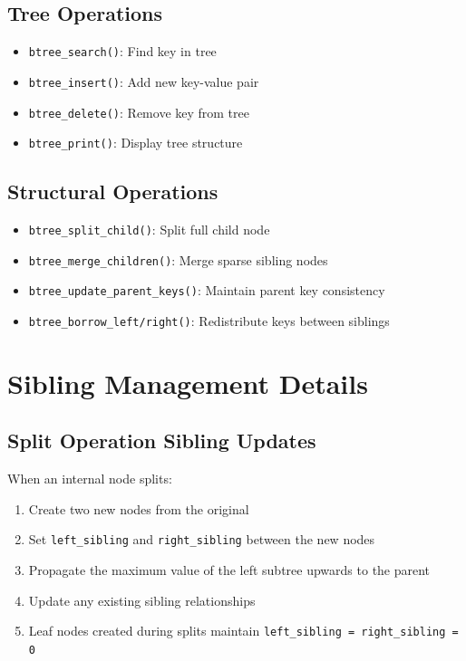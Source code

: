\documentclass[12pt,a4paper]{article}
\begin{document}
\subsection{Tree Operations}
\begin{itemize}
    \item \texttt{btree\_search()}: Find key in tree
    \item \texttt{btree\_insert()}: Add new key-value pair
    \item \texttt{btree\_delete()}: Remove key from tree
    \item \texttt{btree\_print()}: Display tree structure
\end{itemize}

\subsection{Structural Operations}
\begin{itemize}
    \item \texttt{btree\_split\_child()}: Split full child node
    \item \texttt{btree\_merge\_children()}: Merge sparse sibling nodes
    \item \texttt{btree\_update\_parent\_keys()}: Maintain parent key consistency
    \item \texttt{btree\_borrow\_left/right()}: Redistribute keys between siblings
\end{itemize}

\section{Sibling Management Details}

\subsection{Split Operation Sibling Updates}

When an internal node splits:
\begin{enumerate}
    \item Create two new nodes from the original
    \item Set \texttt{left\_sibling} and \texttt{right\_sibling} between the new nodes
    \item Propagate the maximum value of the left subtree upwards to the parent
    \item Update any existing sibling relationships
    \item Leaf nodes created during splits maintain \texttt{left\_sibling = right\_sibling = 0}
\end{enumerate}
\end{document}
